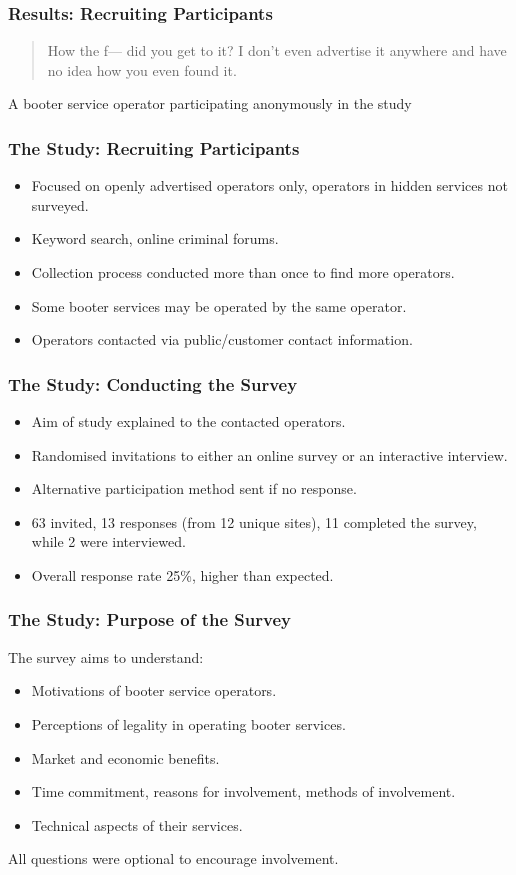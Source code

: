 \documentclass[aspectratio=1610]{beamer}
\begin{document}
\begin{frame}
\frametitle{Results: Recruiting Participants}
\begin{quote}
How the f--- did you get to it? I don't even advertise it anywhere and have no idea how you even found it.
\end{quote}
\begin{flushright} A booter service operator participating anonymously in the study \end{flushright} 
\end{frame}

\begin{frame}
\frametitle{The Study: Recruiting Participants}
\begin{itemize}
\setlength\itemsep{1em}
\item Focused on openly advertised operators only, operators in hidden services not surveyed.
\item Keyword search, online criminal forums.
\item Collection process conducted more than once to find more operators.
\item Some booter services may be operated by the same operator.
\item Operators contacted via public/customer contact information.
\end{itemize}
\end{frame}

\begin{frame}
\frametitle{The Study: Conducting the Survey}
\begin{itemize}
\setlength\itemsep{1em}
\item Aim of study explained to the contacted operators.
\item Randomised invitations to either an online survey or an interactive interview.
\item Alternative participation method sent if no response.
\item 63 invited, 13 responses (from 12 unique sites), 11 completed the survey, while 2 were interviewed.
\item Overall response rate 25\%, higher than expected. 
\end{itemize}
\end{frame}


\begin{frame}
\frametitle{The Study: Purpose of the Survey}
The survey aims to understand: \par
\begin{itemize}
\setlength\itemsep{1em}
\item Motivations of booter service operators.
\item Perceptions of legality in operating booter services.
\item Market and economic benefits.
\item Time commitment, reasons for involvement, methods of involvement.
\item Technical aspects of their services.
\end{itemize}
\vspace{0.5em}
All questions were optional to encourage involvement.
\end{frame}
\end{document}
